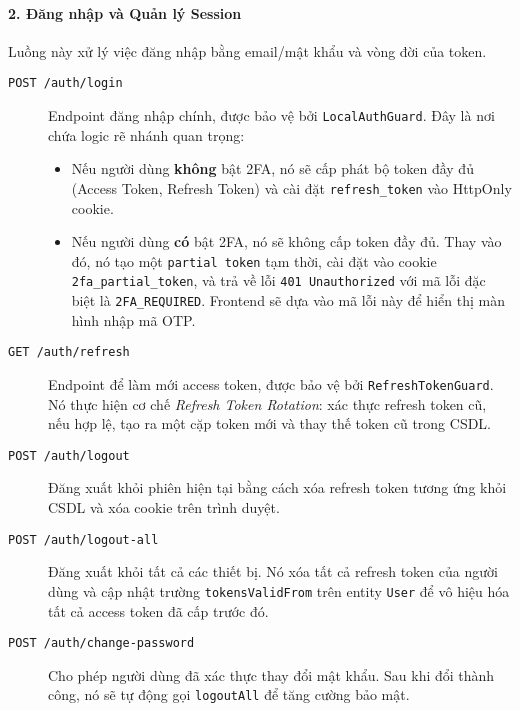 \paragraph{2. Đăng nhập và Quản lý Session}
Luồng này xử lý việc đăng nhập bằng email/mật khẩu và vòng đời của token.
\begin{description}
    \item[\texttt{POST /auth/login}] Endpoint đăng nhập chính, được bảo vệ bởi \texttt{LocalAuthGuard}. Đây là nơi chứa logic rẽ nhánh quan trọng:
    \begin{itemize}
        \item Nếu người dùng \textbf{không} bật 2FA, nó sẽ cấp phát bộ token đầy đủ (Access Token, Refresh Token) và cài đặt \texttt{refresh\_token} vào HttpOnly cookie.
        \item Nếu người dùng \textbf{có} bật 2FA, nó sẽ không cấp token đầy đủ. Thay vào đó, nó tạo một \texttt{partial token} tạm thời, cài đặt vào cookie \texttt{2fa\_partial\_token}, và trả về lỗi \texttt{401 Unauthorized} với mã lỗi đặc biệt là \texttt{2FA\_REQUIRED}. Frontend sẽ dựa vào mã lỗi này để hiển thị màn hình nhập mã OTP.
    \end{itemize}
    \item[\texttt{GET /auth/refresh}] Endpoint để làm mới access token, được bảo vệ bởi \texttt{RefreshTokenGuard}. Nó thực hiện cơ chế \textit{Refresh Token Rotation}: xác thực refresh token cũ, nếu hợp lệ, tạo ra một cặp token mới và thay thế token cũ trong CSDL.
    \item[\texttt{POST /auth/logout}] Đăng xuất khỏi phiên hiện tại bằng cách xóa refresh token tương ứng khỏi CSDL và xóa cookie trên trình duyệt.
    \item[\texttt{POST /auth/logout-all}] Đăng xuất khỏi tất cả các thiết bị. Nó xóa tất cả refresh token của người dùng và cập nhật trường \texttt{tokensValidFrom} trên entity \texttt{User} để vô hiệu hóa tất cả access token đã cấp trước đó.
    \item[\texttt{POST /auth/change-password}] Cho phép người dùng đã xác thực thay đổi mật khẩu. Sau khi đổi thành công, nó sẽ tự động gọi \texttt{logoutAll} để tăng cường bảo mật.
\end{description}

